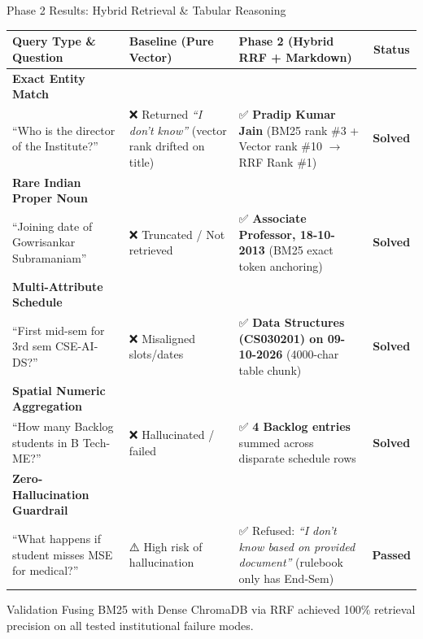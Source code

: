 \documentclass[11pt]{beamer}
\begin{document}
\begin{frame}{Phase 2 Results: Hybrid Retrieval \& Tabular Reasoning}
    \begin{table}[h]
    \centering
    \tiny
    \begin{tabular}{@{}p{3.2cm}p{2.8cm}p{3.8cm}c@{}}
        \toprule
        \textbf{Query Type \& Question} & \textbf{Baseline (Pure Vector)} & \textbf{Phase 2 (Hybrid RRF + Markdown)} & \textbf{Status}\\
        \midrule
        \textbf{Exact Entity Match}\\
        ``Who is the director of the Institute?'' & ❌ Returned \textit{``I don't know''} (vector rank drifted on title) & ✅ \textbf{Pradip Kumar Jain} (BM25 rank \#3 + Vector rank \#10 $\rightarrow$ RRF Rank \#1) & \textcolor{implgreen}{\textbf{Solved}}\\[3pt]
        \textbf{Rare Indian Proper Noun}\\
        ``Joining date of Gowrisankar Subramaniam'' & ❌ Truncated / Not retrieved & ✅ \textbf{Associate Professor, 18-10-2013} (BM25 exact token anchoring) & \textcolor{implgreen}{\textbf{Solved}}\\[3pt]
        \textbf{Multi-Attribute Schedule}\\
        ``First mid-sem for 3rd sem CSE-AI-DS?'' & ❌ Misaligned slots/dates & ✅ \textbf{Data Structures (CS030201) on 09-10-2026} (4000-char table chunk) & \textcolor{implgreen}{\textbf{Solved}}\\[3pt]
        \textbf{Spatial Numeric Aggregation}\\
        ``How many Backlog students in B Tech-ME?'' & ❌ Hallucinated / failed & ✅ \textbf{4 Backlog entries} summed across disparate schedule rows & \textcolor{implgreen}{\textbf{Solved}}\\[3pt]
        \textbf{Zero-Hallucination Guardrail}\\
        ``What happens if student misses MSE for medical?'' & ⚠️ High risk of hallucination & ✅ Refused: \textit{``I don't know based on provided document''} (rulebook only has End-Sem) & \textcolor{implgreen}{\textbf{Passed}}\\
        \bottomrule
    \end{tabular}
    \end{table}
    \vspace{2pt}
    \begin{block}{Validation}
        Fusing BM25 with Dense ChromaDB via RRF achieved 100\% retrieval precision on all tested institutional failure modes.
    \end{block}
\end{frame}
\end{document}

